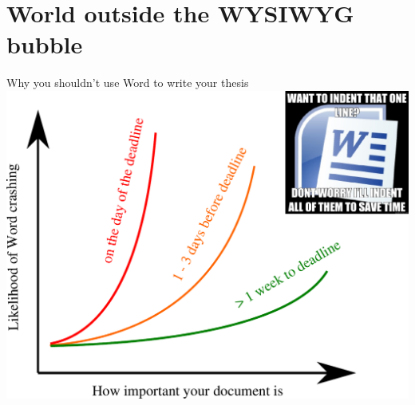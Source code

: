 \documentclass[10pt,times]{beamer}
\subtitle{\LaTeX, vector graphics, reference management and version control}
\begin{document}
\begin{frame}
  \titlepage
\end{frame}

\section{World outside the WYSIWYG bubble}

\begin{frame}{Why you shouldn't use Word to write your thesis}
  \centering
  \includegraphics[height=0.8\textheight]{figs/word_crash}
\end{frame}
\end{document}
